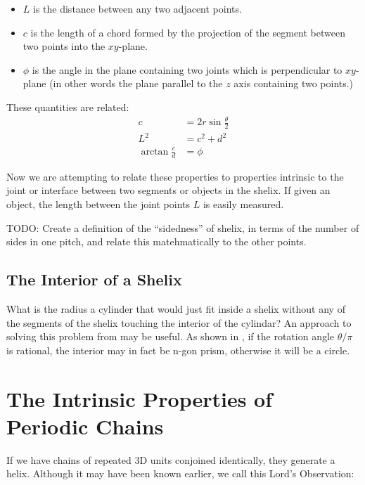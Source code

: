 \documentclass[11pt]{article}
\begin{document}
{\begin{itemize}
\item $L$ is the distance between any two adjacent points.
\item $c$ is the length of a chord formed by the projection of the segment between two points into the $xy$-plane.
\item $\phi$ is the angle in the plane containing two joints which is perpendicular to $xy$-plane
  (in other words the plane parallel to the $z$ axis containing two points.)
  \end{itemize}
These quantities are related:
\begin{align}
    c &= 2r\sin{\frac{\theta}{2}} \\
    L^2 &= c^2+d^2  \\
    \arctan{\frac{c}{d}}  &= \phi 
\end{align}

Now we are attempting to relate these properties to properties intrinsic to the joint or interface between
two segments or objects in the shelix. If given an object, the length between the joint points $L$ is
easily measured.

TODO: Create a definition of the ``sidedness'' of shelix,
in terms of the number of sides in one pitch, and relate
this matehmatically to the other points.

\subsection{The Interior of a Shelix}

What is the radius a cylinder that would just fit inside a shelix without any of the segments of the shelix
touching the interior of the cylindar? An approach to solving this problem from \cite{read2018transforming}
may be useful. As shown in \cite{read2018transforming}, if the rotation angle $\theta/\pi$ is rational, the
interior may in fact be n-gon prism, otherwise it will be a circle.

\section{The Intrinsic Properties of Periodic Chains}

If we have chains of repeated 3D units conjoined identically, they generate a helix.
Although it may have been known earlier, we call this Lord's Observation:

}
\end{document}
